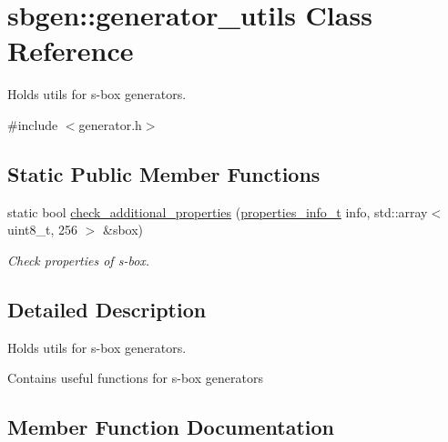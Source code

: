 \hypertarget{classsbgen_1_1generator__utils}{}\section{sbgen\+:\+:generator\+\_\+utils Class Reference}
\label{classsbgen_1_1generator__utils}


Holds utils for s-\/box generators.  




{\ttfamily \#include $<$generator.\+h$>$}

\subsection*{Static Public Member Functions}
\begin{DoxyCompactItemize}
\item 
static bool \hyperlink{classsbgen_1_1generator__utils_a5d0fea3bbc7afcaa594d596bc40ec2e7}{check\+\_\+additional\+\_\+properties} (\hyperlink{structsbgen_1_1properties__info__t}{properties\+\_\+info\+\_\+t} info, std\+::array$<$ uint8\+\_\+t, 256 $>$ \&sbox)
\begin{DoxyCompactList}\small\item\em Check properties of s-\/box. \end{DoxyCompactList}\end{DoxyCompactItemize}


\subsection{Detailed Description}
Holds utils for s-\/box generators. 

Contains useful functions for s-\/box generators 

\subsection{Member Function Documentation}
\mbox{\label{classsbgen_1_1generator__utils_a5d0fea3bbc7afcaa594d596bc40ec2e7}} 
